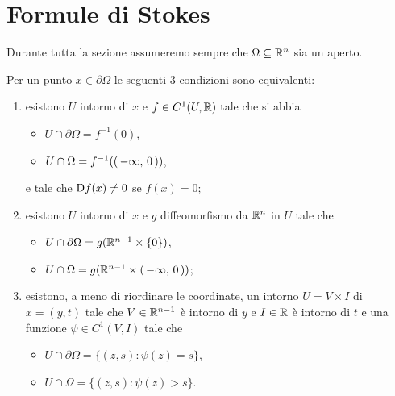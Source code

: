 \section{Formule di Stokes}\label{sezione:FormuleStokes}

Durante tutta la sezione assumeremo sempre che $\Omega\subseteq\mathbb R^n$ sia un aperto.

\begin{theorem}\label{thm:PtRegEquiv}
	Per un punto $x\in \partial \Omega$ le seguenti $3$ condizioni sono equivalenti:
	\begin{enumerate}
		\item esistono $U$ intorno di $x$ e $f\in C^1(U,\mathbb R)$ tale che si abbia
			\begin{itemize}
				\item $U\cap \partial \Omega=f^{-1}(0)$,
				\item $U\cap \Omega=f^{-1}(\left(\,-\infty,\,0\,\right))$,
			\end{itemize}
			e tale che $\mathrm D f(x)\neq 0$ se $f(x)=0$;\label{PRE:i}
		\item esistono $U$ intorno di $x$ e $g$ diffeomorfismo da $\mathbb R^n$ in $U$ tale che\label{PRE:ii}
			\begin{itemize}
				\item $U\cap \partial \Omega = g(\mathbb R^{n-1}\times\{0\})$,
				\item $U\cap \Omega = g(\mathbb R^{n-1}\times\left(\,-\infty,\,0\,\right))$;
			\end{itemize}
		\item esistono, a meno di riordinare le coordinate, un intorno $U=V\times I$ di $x=(y,t)$ tale che $V\in\mathbb R^{n-1}$ è intorno di $y$
			e $I\in\mathbb R$ è intorno di $t$ e una funzione $\psi\in C^1(V,I)$ tale che
			\begin{itemize}
				\item $U\cap \partial \Omega = \{(z,s):\psi(z)=s\}$,
				\item $U\cap \Omega = \{(z,s):\psi(z)>s\}$.
			\end{itemize}\label{PRE:iii}
	\end{enumerate}
\end{theorem}

